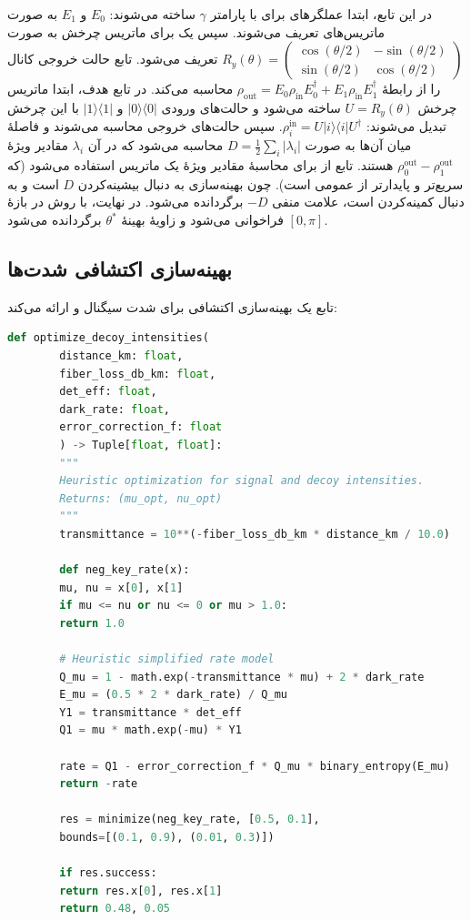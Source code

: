 در این تابع، ابتدا عملگرهای  برای  با پارامتر $\gamma$ ساخته می‌شوند: $E_0$ و $E_1$ به صورت ماتریس‌های  تعریف می‌شوند. سپس یک  برای ماتریس چرخش  به صورت $R_y(\theta) = \begin{pmatrix} \cos(\theta/2) & -\sin(\theta/2) \\ \sin(\theta/2) & \cos(\theta/2) \end{pmatrix}$ تعریف می‌شود. تابع  حالت خروجی کانال را از رابطۀ $\rho_{\text{out}} = E_0 \rho_{\text{in}} E_0^\dagger + E_1 \rho_{\text{in}} E_1^\dagger$ محاسبه می‌کند. در تابع هدف، ابتدا ماتریس چرخش $U = R_y(\theta)$ ساخته می‌شود و حالت‌های ورودی $|0\rangle\langle 0|$ و $|1\rangle\langle 1|$ با این چرخش تبدیل می‌شوند: $\rho_i^{\text{in}} = U |i\rangle\langle i| U^\dagger$. سپس حالت‌های خروجی محاسبه می‌شوند و فاصلۀ  میان آن‌ها به صورت $D = \frac{1}{2} \sum_i |\lambda_i|$ محاسبه می‌شود که در آن $\lambda_i$ مقادیر ویژۀ $\rho_0^{\text{out}} - \rho_1^{\text{out}}$ هستند. تابع  از  برای محاسبۀ مقادیر ویژۀ یک ماتریس  استفاده می‌شود (که سریع‌تر و پایدارتر از  عمومی است). چون بهینه‌سازی به دنبال بیشینه‌کردن $D$ است و  به دنبال کمینه‌کردن است، علامت منفی $-D$ برگردانده می‌شود. در نهایت،  با روش  در بازۀ $[0, \pi]$ فراخوانی می‌شود و زاویۀ بهینۀ $\theta^*$ برگردانده می‌شود.

\subsection{بهینه‌سازی اکتشافی شدت‌ها}

تابع  یک بهینه‌سازی اکتشافی برای شدت سیگنال و  ارائه می‌کند:

\begin{LTR}
	\begin{lstlisting}[language=Python]
		def optimize_decoy_intensities(
		distance_km: float,
		fiber_loss_db_km: float,
		det_eff: float,
		dark_rate: float,
		error_correction_f: float
		) -> Tuple[float, float]:
		"""
		Heuristic optimization for signal and decoy intensities.
		Returns: (mu_opt, nu_opt)
		"""
		transmittance = 10**(-fiber_loss_db_km * distance_km / 10.0)
		
		def neg_key_rate(x):
		mu, nu = x[0], x[1]
		if mu <= nu or nu <= 0 or mu > 1.0:
		return 1.0
		
		# Heuristic simplified rate model
		Q_mu = 1 - math.exp(-transmittance * mu) + 2 * dark_rate
		E_mu = (0.5 * 2 * dark_rate) / Q_mu
		Y1 = transmittance * det_eff
		Q1 = mu * math.exp(-mu) * Y1
		
		rate = Q1 - error_correction_f * Q_mu * binary_entropy(E_mu)
		return -rate
		
		res = minimize(neg_key_rate, [0.5, 0.1],
		bounds=[(0.1, 0.9), (0.01, 0.3)])
		
		if res.success:
		return res.x[0], res.x[1]
		return 0.48, 0.05
	\end{lstlisting}
\end{LTR}

